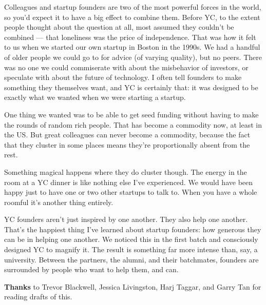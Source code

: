 Colleagues and startup founders are two of the most powerful forces in
the world, so you'd expect it to have a big effect to combine them.
Before YC, to the extent people thought about the question at all, most
assumed they couldn't be combined --- that loneliness was the price of
independence. That was how it felt to us when we started our own startup
in Boston in the 1990s. We had a handful of older people we could go to
for advice (of varying quality), but no peers. There was no one we could
commiserate with about the misbehavior of investors, or speculate with
about the future of technology. I often tell founders to make something
they themselves want, and YC is certainly that: it was designed to be
exactly what we wanted when we were starting a startup.

One thing we wanted was to be able to get seed funding without having to
make the rounds of random rich people. That has become a commodity now,
at least in the US. But great colleagues can never become a commodity,
because the fact that they cluster in some places means they're
proportionally absent from the rest.

Something magical happens where they do cluster though. The energy in
the room at a YC dinner is like nothing else I've experienced. We would
have been happy just to have one or two other startups to talk to. When
you have a whole roomful it's another thing entirely.

YC founders aren't just inspired by one another. They also help one
another. That's the happiest thing I've learned about startup founders:
how generous they can be in helping one another. We noticed this in the
first batch and consciously designed YC to magnify it. The result is
something far more intense than, say, a university. Between the
partners, the alumni, and their batchmates, founders are surrounded by
people who want to help them, and can.


\textbf{Thanks} to Trevor Blackwell, Jessica Livingston, Harj Taggar,
and Garry Tan for reading drafts of this.